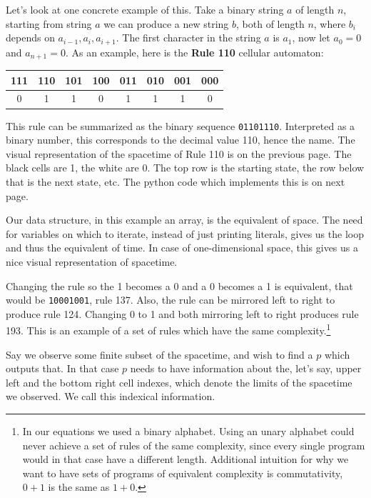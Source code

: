 \documentclass[oneside,hidelinks]{article}
\begin{document}
Let's look at one concrete example of this.
Take a binary string $a$ of length $n$, starting from string $a$ we can produce a new string $b$, both of length $n$, where $b_i$ depends on $a_{i-1}, a_i, a_{i+1}$.
The first character in the string $a$ is $a_1$, now let $a_0 = 0$ and $a_{n+1} = 0$.
As an example, here is the \textbf{Rule 110} cellular automaton:

\begin{table}[h!]
\centering
 \begin{tabular}{|c|c|c|c|c|c|c|c|}
 \hline
 111 & 110 & 101 & 100 & 011 & 010 & 001 & 000 \\ [0.5ex]
 \hline
 0 & 1 & 1 & 0 & 1 & 1 & 1 & 0 \\
 \hline
\end{tabular}
\end{table}

This rule can be summarized as the binary sequence \texttt{01101110}.
Interpreted as a binary number, this corresponds to the decimal value 110, hence the name.
The visual representation of the spacetime of Rule 110 is on the previous page.
The black cells are 1, the white are 0.
The top row is the starting state, the row below that is the next state, etc.
The python code which implements this is on next page.

Our data structure, in this example an array, is the equivalent of space.
The need for variables on which to iterate, instead of just printing literals, gives us the loop and thus the equivalent of time.
In case of one-dimensional space, this gives us a nice visual representation of spacetime.

Changing the rule so the 1 becomes a 0 and a 0 becomes a 1 is equivalent, that would be \texttt{10001001}, rule 137.
Also, the rule can be mirrored left to right to produce rule 124.
Changing 0 to 1 and both mirroring left to right produces rule 193.
This is an example of a set of rules which have the same complexity.\footnote{
In our equations we used a binary alphabet.
Using an unary alphabet could never achieve a set of rules of the same complexity, since every single program would in that case have a different length.
Additional intuition for why we want to have sets of programs of equivalent complexity is commutativity, $0+1$ is the same as $1+0$.
}

Say we observe some finite subset of the spacetime, and wish to find a $p$ which outputs that.
In that case $p$ needs to have information about the, let's say, upper left and the bottom right cell indexes, which denote the limits of the spacetime we observed.
We call this indexical information.
\end{document}
